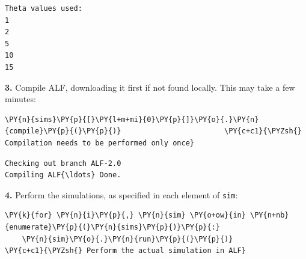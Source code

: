     \begin{Verbatim}[commandchars=\\\{\}]
Theta values used:
1
2
5
10
15
    \end{Verbatim}

    \textbf{3.} Compile ALF, downloading it first if not found locally. This
may take a few minutes:

    \begin{tcolorbox}[breakable, size=fbox, boxrule=1pt, pad at break*=1mm,colback=cellbackground, colframe=cellborder]
\begin{Verbatim}[commandchars=\\\{\}]
\PY{n}{sims}\PY{p}{[}\PY{l+m+mi}{0}\PY{p}{]}\PY{o}{.}\PY{n}{compile}\PY{p}{(}\PY{p}{)}                        \PY{c+c1}{\PYZsh{} Compilation needs to be performed only once}
\end{Verbatim}
\end{tcolorbox}

    \begin{Verbatim}[commandchars=\\\{\}]
Checking out branch ALF-2.0
Compiling ALF{\ldots} Done.
    \end{Verbatim}

    \textbf{4.} Perform the simulations, as specified in each element of
\texttt{sim}:

    \begin{tcolorbox}[breakable, size=fbox, boxrule=1pt, pad at break*=1mm,colback=cellbackground, colframe=cellborder]
\begin{Verbatim}[commandchars=\\\{\}]
\PY{k}{for} \PY{n}{i}\PY{p}{,} \PY{n}{sim} \PY{o+ow}{in} \PY{n+nb}{enumerate}\PY{p}{(}\PY{n}{sims}\PY{p}{)}\PY{p}{:}
    \PY{n}{sim}\PY{o}{.}\PY{n}{run}\PY{p}{(}\PY{p}{)}                            \PY{c+c1}{\PYZsh{} Perform the actual simulation in ALF}
\end{Verbatim}
\end{tcolorbox}

